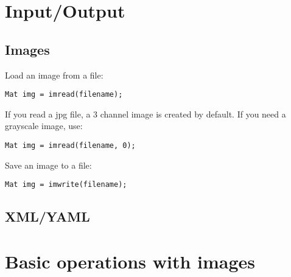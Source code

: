

\ifCpp
\section{Input/Output}
\subsection{Images}
Load an image from a file:
\begin{lstlisting}
Mat img = imread(filename);
\end{lstlisting}
If you read a jpg file, a 3 channel image is created by default. If you need a grayscale image, use:
\begin{lstlisting}
Mat img = imread(filename, 0);
\end{lstlisting}
Save an image to a file:
\begin{lstlisting}
Mat img = imwrite(filename);
\end{lstlisting}
\subsection{XML/YAML}

\section{Basic operations with images}

